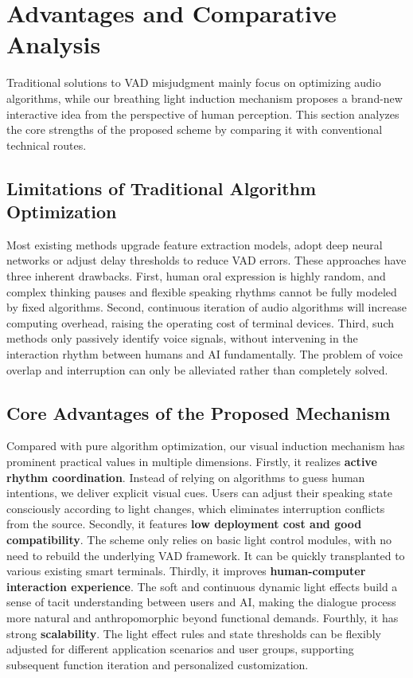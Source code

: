 \documentclass{article}
\begin{document}
\section{Advantages and Comparative Analysis}
Traditional solutions to VAD misjudgment mainly focus on optimizing audio algorithms, while
our breathing light induction mechanism proposes a brand-new interactive idea from the
perspective of human perception. This section analyzes the core strengths of the proposed
scheme by comparing it with conventional technical routes.
\subsection{Limitations of Traditional Algorithm Optimization}
Most existing methods upgrade feature extraction models, adopt deep neural networks or
adjust delay thresholds to reduce VAD errors. These approaches have three inherent
drawbacks. First, human oral expression is highly random, and complex thinking pauses and
flexible speaking rhythms cannot be fully modeled by fixed algorithms. Second, continuous
iteration of audio algorithms will increase computing overhead, raising the operating cost of
terminal devices. Third, such methods only passively identify voice signals, without
intervening in the interaction rhythm between humans and AI fundamentally. The problem of
voice overlap and interruption can only be alleviated rather than completely solved.
\subsection{Core Advantages of the Proposed Mechanism}
Compared with pure algorithm optimization, our visual induction mechanism has prominent
practical values in multiple dimensions.
Firstly, it realizes \textbf{active rhythm coordination}. Instead of relying on algorithms to
guess human intentions, we deliver explicit visual cues. Users can adjust their speaking
state consciously according to light changes, which eliminates interruption conflicts from the
source.
Secondly, it features \textbf{low deployment cost and good compatibility}. The scheme only
relies on basic light control modules, with no need to rebuild the underlying VAD framework.
It can be quickly transplanted to various existing smart terminals.
Thirdly, it improves \textbf{human-computer interaction experience}. The soft and continuous
dynamic light effects build a sense of tacit understanding between users and AI, making the
dialogue process more natural and anthropomorphic beyond functional demands.
Fourthly, it has strong \textbf{scalability}. The light effect rules and state thresholds can be
flexibly adjusted for different application scenarios and user groups, supporting subsequent
function iteration and personalized customization.
\end{document}
